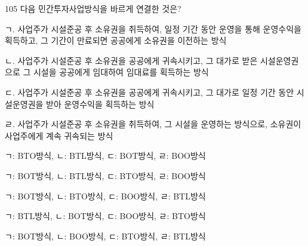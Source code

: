 \begin{question}{105}
다음 민간투자사업방식을 바르게 연결한 것은?
\begin{framedtext}
ㄱ. 사업주가 시설준공 후 소유권을 취득하여, 일정 기간 동안 운영을 통해 운영수익을 획득하고, 그 기간이 만료되면 공공에게 소유권을 이전하는 방식 \par
ㄴ. 사업주가 시설준공 후 소유권을 공공에게 귀속시키고, 그 대가로 받은 시설운영권으로 그 시설을 공공에게 임대하여 임대료를 획득하는 방식 \par
ㄷ. 사업주가 시설준공 후 소유권을 공공에게 귀속시키고, 그 대가로 일정 기간 동안 시설운영권을 받아 운영수익을 획득하는 방식 \par
ㄹ. 사업주가 시설준공 후 소유권을 취득하여, 그 시설을 운영하는 방식으로, 소유권이 사업주에게 계속 귀속되는 방식 \par
\end{framedtext}
\begin{choices}
  \item ㄱ: BTO방식, ㄴ: BTL방식, ㄷ: BOT방식, ㄹ: BOO방식
  \item ㄱ: BOT방식, ㄴ: BTL방식, ㄷ: BTO방식, ㄹ: BOO방식
  \item ㄱ: BOT방식, ㄴ: BTO방식, ㄷ: BOO방식, ㄹ: BTL방식
  \item ㄱ: BTL방식, ㄴ: BOT방식, ㄷ: BOO방식, ㄹ: BTO방식
  \item ㄱ: BOT방식, ㄴ: BOO방식, ㄷ: BTO방식, ㄹ: BTL방식
\end{choices}
\end{question}
